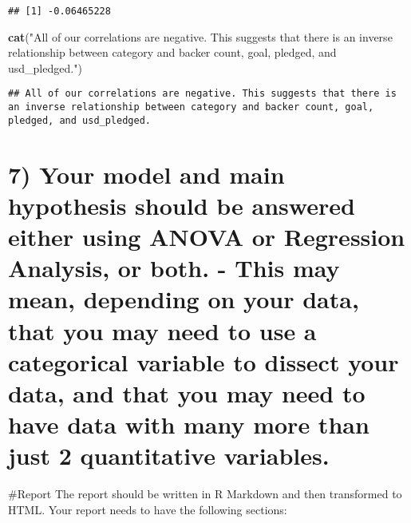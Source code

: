 \documentclass[
]{article}
\newenvironment{Shaded}{\begin{snugshade}}{\end{snugshade}}
\newcommand{\KeywordTok}[1]{\textcolor[rgb]{0.13,0.29,0.53}{\textbf{#1}}}
\newcommand{\NormalTok}[1]{#1}
\newcommand{\OperatorTok}[1]{\textcolor[rgb]{0.81,0.36,0.00}{\textbf{#1}}}
\newcommand{\StringTok}[1]{\textcolor[rgb]{0.31,0.60,0.02}{#1}}
\begin{document}
\begin{Shaded}
\end{Shaded}

\begin{verbatim}
## [1] -0.06465228
\end{verbatim}

\begin{Shaded}
\begin{Highlighting}[]
\KeywordTok{cat}\NormalTok{(}\StringTok{"All of our correlations are negative. This suggests that there is an inverse relationship between category and backer count, goal, pledged, and usd_pledged."}\NormalTok{)}
\end{Highlighting}
\end{Shaded}

\begin{verbatim}
## All of our correlations are negative. This suggests that there is an inverse relationship between category and backer count, goal, pledged, and usd_pledged.
\end{verbatim}

\hypertarget{your-model-and-main-hypothesis-should-be-answered-either-using-anova-or-regression-analysis-or-both.---this-may-mean-depending-on-your-data-that-you-may-need-to-use-a-categorical-variable-to-dissect-your-data-and-that-you-may-need-to-have-data-with-many-more-than-just-2-quantitative-variables.}{%
\section{7) Your model and main hypothesis should be answered either
using ANOVA or Regression Analysis, or both. - This may mean, depending
on your data, that you may need to use a categorical variable to dissect
your data, and that you may need to have data with many more than just 2
quantitative
variables.}\label{your-model-and-main-hypothesis-should-be-answered-either-using-anova-or-regression-analysis-or-both.---this-may-mean-depending-on-your-data-that-you-may-need-to-use-a-categorical-variable-to-dissect-your-data-and-that-you-may-need-to-have-data-with-many-more-than-just-2-quantitative-variables.}}

\#Report The report should be written in R Markdown and then transformed
to HTML. Your report needs to have the following sections:
\end{document}
